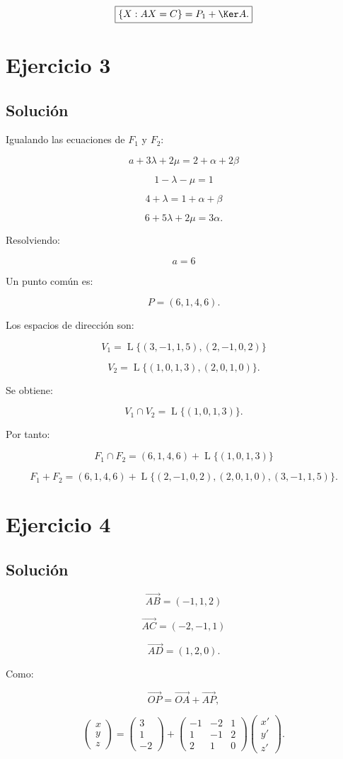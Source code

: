 \documentclass[11pt,a4paper]{article}
\newcommand{\Span}{\operatorname{L}}
\begin{document}
\[
\boxed{
\{X:AX=C\}=P_1+\Ker A.
}
\]

\section{Ejercicio 3}
\subsection{Solución}

Igualando las ecuaciones de $F_1$ y $F_2$:

\[
a+3\lambda+2\mu=2+\alpha+2\beta
\]

\[
1-\lambda-\mu=1
\]

\[
4+\lambda=1+\alpha+\beta
\]

\[
6+5\lambda+2\mu=3\alpha.
\]

Resolviendo:

\[
\boxed{a=6}
\]

Un punto común es:

\[
P=(6,1,4,6).
\]

Los espacios de dirección son:

\[
V_1=
\Span\{(3,-1,1,5),(2,-1,0,2)\}
\]

\[
V_2=
\Span\{(1,0,1,3),(2,0,1,0)\}.
\]

Se obtiene:

\[
V_1\cap V_2=
\Span\{(1,0,1,3)\}.
\]

Por tanto:

\[
\boxed{
F_1\cap F_2
=
(6,1,4,6)+\Span\{(1,0,1,3)\}
}
\]

\[
\boxed{
F_1+F_2
=
(6,1,4,6)
+
\Span\{(2,-1,0,2),(2,0,1,0),(3,-1,1,5)\}.
}
\]

\section{Ejercicio 4}
\subsection{Solución}

\[
\overrightarrow{AB}=(-1,1,2)
\]

\[
\overrightarrow{AC}=(-2,-1,1)
\]

\[
\overrightarrow{AD}=(1,2,0).
\]

Como:

\[
\overrightarrow{OP}
=
\overrightarrow{OA}+\overrightarrow{AP},
\]

\[
\begin{pmatrix}
x\\y\\z
\end{pmatrix}
=
\begin{pmatrix}
3\\1\\-2
\end{pmatrix}
+
\begin{pmatrix}
-1&-2&1\\
1&-1&2\\
2&1&0
\end{pmatrix}
\begin{pmatrix}
x'\\y'\\z'
\end{pmatrix}.
\]
\end{document}
